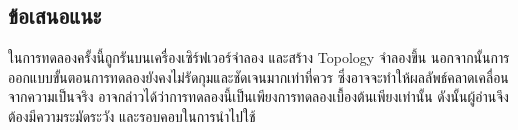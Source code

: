 \subsection{ข้อเสนอแนะ}
\indent\indent
ในการทดลองครั้งนี้ถูกรันบนเครื่องเซิร์ฟเวอร์จำลอง และสร้าง Topology จำลองขึ้น นอกจากนั้นการออกแบบขั้นตอนการทดลองยังคงไม่รัดกุมและชัดเจนมากเท่าที่ควร 
ซึ่งอาจจะทำให้ผลลัพธ์คลาดเคลื่อนจากความเป็นจริง อาจกล่าวได้ว่าการทดลองนี้เป็นเพียงการทดลองเบื้องต้นเพียงเท่านั้น
ดังนั้นผู้อ่านจึงต้องมีความระมัดระวัง และรอบคอบในการนำไปใช้

\begin{comment}

group_single 8.7 80.4 44.2 | 44.4 | 8.7
group_single 18.7 8.4 6.8         | 18.7

group_multi 32.5 31.2 20.4 | 28.0 | 20.4
group_multi 23.5 21.8 21.5        | 21.5

arp_single 12   6.3  70.3  | 29.5 | 6.3
arp_single 19.2 14.1 7.8          | 14.1  

arp_multi 37.2 25.6 19.4   | 27.4 | 19.4
arp_multi 24.1 25.5 22.3          | 22.3

\end{comment}
